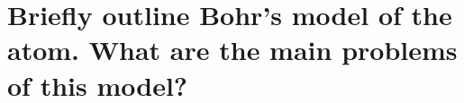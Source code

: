 \section{Briefly outline Bohr's model of the atom. What are the main problems of this model?}

\huge

\normalsize